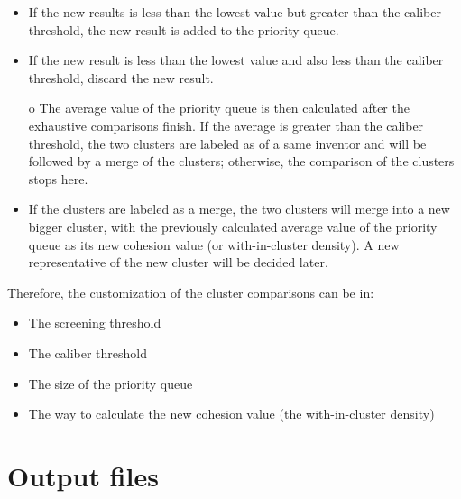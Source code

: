 \documentclass{article}
\begin{document}
\begin{itemize}
\item If the new results is less than the lowest value but greater than the
caliber threshold, the new result is added to the priority queue.

\item If the new result is less than the lowest value and also less than the
caliber threshold, discard the new result.

o The average value of the priority queue is then calculated after the exhaustive
comparisons finish. If the average is greater than the caliber threshold, the two
clusters are labeled as of a same inventor and will be followed by a merge of the
clusters; otherwise, the comparison of the clusters stops here.

\item If the clusters are labeled as a merge, the two clusters 
will merge into a new bigger cluster, with the previously calculated 
average value of the priority queue as its new cohesion value
(or with-in-cluster density). A new representative of the new 
cluster will be decided later.

\end{itemize}



Therefore, the customization of the cluster comparisons can be in:

\begin{itemize}

\item The screening threshold

\item The caliber threshold

\item The size of the priority queue

\item The way to calculate the new cohesion value (the with-in-cluster density)

\end{itemize}


\appendix


\section{Output files}
\end{document}
